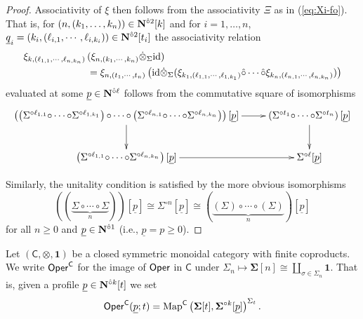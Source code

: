 \begin{proof}
Associativity of $\xi$ then follows from the associativity $\Xi$ as in (\ref{eq:Xi-fo}). That is, for $(n,(k_1,\dots,k_n))\in \mathbf{N}^{\hat{\circ}2}[k]$ and for $i=1,\dots,n$, $\underline{q}_i=(k_i,(\ell_{i,1},\cdots,\ell_{i,k_i})) \in \mathbf{N}^{\hat{\circ}2}[t_i]$ %
the associativity relation \begin{align*}
     \xi_{k,(\ell_{1,1},\cdots, \ell_{n,k_n})}\,& ( \xi_{n,(k_1,\cdots,k_n)} \dot{\otimes}_{\Sigma} \mathrm{id}) \\
     &=\xi_{n,(t_1,\cdots,t_n)} \, \big(\mathrm{id} \dot{\otimes}_{\Sigma}  (\xi_{k_1,(\ell_{1,1},\cdots,\ell_{1,k_1})} \hat{\circ} \cdots \hat{\circ} \xi_{k_n,(\ell_{n,1},\cdots,\ell_{n,k_n})})\big)\end{align*}
evaluated at some $\underline{p}\in \mathbf{N}^{\hat{\circ}\ell}$ follows from the commutative square of isomorphisms
\[ \xymatrix{
    \left(\left(\Sigma^{\circ \ell_{1,1}} {\circ} \cdots {\circ} \Sigma^{\circ \ell_{1,k_1}}\right){\circ} \cdots {\circ} \left(\Sigma^{\circ \ell_{n,1}} {\circ} \cdots {\circ} \Sigma^{\circ \ell_{n,k_n}}\right)\right) [\underline{p}] \ar[r] \ar[d] 
    & 
    \left(\Sigma^{\circ t_1} {\circ} \cdots {\circ} \Sigma^{\circ t_n}\right) [\underline{p}] \ar[d]
    \\
    \left( \Sigma^{\circ \ell_{1,1}} {\circ}  \cdots {\circ} \Sigma^{\circ \ell_{n,k_n}}\right)[\underline{p}] \ar[r]
    &
    \Sigma^{\circ \ell}[\underline{p}]
}\]

Similarly, the unitality condition is satisfied by the more obvious isomorphisms \[ \left( ( \underbrace{\Sigma \circ \cdots \circ \Sigma}_{n}) \right)[\underline{p}] \cong \Sigma^{\circ n}[\underline{p}] \cong \left( \underbrace{(\Sigma) \circ \cdots \circ (\Sigma)}_{n} \right)[\underline{p}]\] for all $n\geq 0$ and $\underline{p}\in \mathbf{N}^{\hat{\circ}1}$ (i.e., $\underline{p}=p\geq 0$). 
\end{proof} 

\begin{remark}
    Let $(\mathsf{C},\otimes, \mathbf{1})$ be a closed symmetric monoidal category with finite coproducts. We write $\mathsf{Oper}^{\mathsf{C}}$ for the image of $\mathsf{Oper}$ in $\mathsf{C}$ under $\Sigma_n\mapsto \mathbf{\Sigma}[n]\cong \coprod_{\sigma\in \Sigma_n} \mathbf{1}$. That is, given a profile $\underline{p}\in \mathbf{N}^{\hat{\circ}k}[t]$ we set \[ \mathsf{Oper}^{\mathsf{C}}(\underline{p};t)= \operatorname{Map}^{\mathsf{C}}\left( \mathbf{\Sigma}[t], \mathbf{\Sigma}^{\circ k} [\underline{p}] \right)^{\Sigma_t}.\]
\end{remark}


